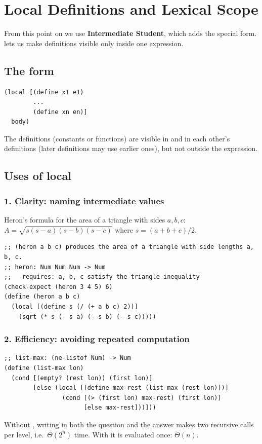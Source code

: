 \chapter{Local Definitions and Lexical Scope}\label{ch:local}

From this point on we use \textbf{Intermediate Student}, which adds the
 special form.  lets us make definitions visible only
inside one expression.

\section{The  form}
\begin{lstlisting}[style=racket]
(local [(define x1 e1)
        ...
        (define xn en)]
  body)
\end{lstlisting}
The definitions (constants or functions) are visible in  and in each
other's definitions (later definitions may use earlier ones), but not outside
the  expression.

\section{Uses of local}

\subsection{1. Clarity: naming intermediate values}
Heron's formula for the area of a triangle with sides $a,b,c$:
$A = \sqrt{s(s-a)(s-b)(s-c)}$ where $s = (a+b+c)/2$.
\begin{lstlisting}[style=racket]
;; (heron a b c) produces the area of a triangle with side lengths a, b, c.
;; heron: Num Num Num -> Num
;;   requires: a, b, c satisfy the triangle inequality
(check-expect (heron 3 4 5) 6)
(define (heron a b c)
  (local [(define s (/ (+ a b c) 2))]
    (sqrt (* s (- s a) (- s b) (- s c)))))
\end{lstlisting}

\subsection{2. Efficiency: avoiding repeated computation}
\begin{lstlisting}[style=racket]
;; list-max: (ne-listof Num) -> Num
(define (list-max lon)
  (cond [(empty? (rest lon)) (first lon)]
        [else (local [(define max-rest (list-max (rest lon)))]
                (cond [(> (first lon) max-rest) (first lon)]
                      [else max-rest]))]))
\end{lstlisting}
Without , writing  in both the
question and the answer makes two recursive calls per level, i.e.\
$\Theta(2^n)$ time. With  it is evaluated once: $\Theta(n)$.

